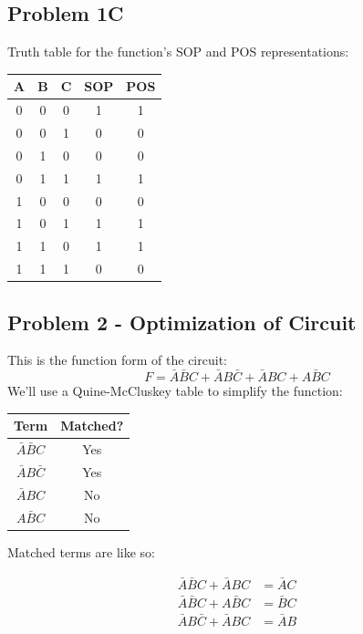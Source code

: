 \documentclass[12pt]{article}
\begin{document}
\subsection*{Problem 1C}
Truth table for the function's SOP and POS representations:

\begin{center}
	\begin{tabular}{| c c c | c c |}
		\hline
		A & B & C & SOP & POS \\
		\hline\hline
		0 & 0 & 0 & 1   & 1   \\
		\hline
		0 & 0 & 1 & 0   & 0   \\
		\hline
		0 & 1 & 0 & 0   & 0   \\
		\hline
		0 & 1 & 1 & 1   & 1   \\
		\hline
		1 & 0 & 0 & 0   & 0   \\
		\hline
		1 & 0 & 1 & 1   & 1   \\
		\hline
		1 & 1 & 0 & 1   & 1   \\
		\hline
		1 & 1 & 1 & 0   & 0   \\
		\hline
	\end{tabular}
\end{center}

\subsection*{Problem 2 - Optimization of Circuit}
This is the function form of the circuit:
\begin{equation*}
	F = \bar{A}\bar{B}C + \bar{A}B\bar{C} + \bar{A}BC + A\bar{B}C
\end{equation*}
We'll use a Quine-McCluskey table to simplify the function:
\begin{center}
	\begin{tabular}{| c | c |}
		\hline
		\textbf{Term}     & \textbf{Matched?} \\
		\hline\hline
		$\bar{A}\bar{B}C$ & Yes               \\
		$\bar{A}B\bar{C}$ & Yes               \\
		\hline
		$\bar{A}BC$       & No                \\
		$A\bar{B}C$       & No                \\
		\hline
	\end{tabular}
\end{center}

Matched terms are like so:

\begin{equation*}
	\begin{split}
		\bar{A}\bar{B}C + \bar{A}BC & = \bar{A}C \\
		\bar{A}\bar{B}C + A\bar{B}C & = \bar{B}C \\
		\bar{A}B\bar{C} + \bar{A}BC & = \bar{A}B
	\end{split}
\end{equation*}
\end{document}
